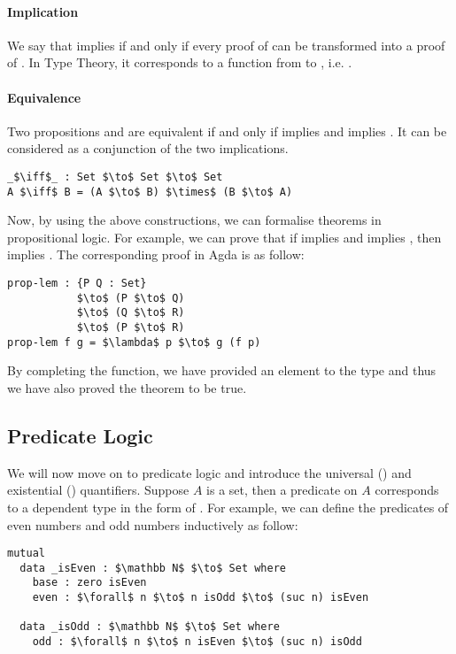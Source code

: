 \paragraph{Implication} We say that  implies  if and only
if every proof of  can be transformed into a proof of . In Type
Theory, it corresponds to a function from  to , i.e. . 

\paragraph{Equivalence} Two propositions  and
 are equivalent if and only if  implies  and  implies
. It can be considered as a conjunction of the two implications.
\begin{lstlisting}[mathescape=true,xleftmargin=.3\textwidth]
_$\iff$_ : Set $\to$ Set $\to$ Set
A $\iff$ B = (A $\to$ B) $\times$ (B $\to$ A)
\end{lstlisting} 

\par Now, by using the above constructions, we can formalise
 theorems in propositional logic. For example, we can prove that if  implies  and
 implies , then  implies . The corresponding
proof in Agda is as follow:
\begin{lstlisting}[mathescape=true,xleftmargin=.3\textwidth]
prop-lem : {P Q : Set} 
           $\to$ (P $\to$ Q) 
           $\to$ (Q $\to$ R) 
           $\to$ (P $\to$ R)
prop-lem f g = $\lambda$ p $\to$ g (f p)
\end{lstlisting} 

\par By completing the function, we have provided an element
to the type  and thus we have
also proved the theorem to be true. 


\subsection{Predicate Logic} 
\par We will now move on to predicate logic and
introduce the universal (\mb{\forall}) and existential (\mb{\exists})
quantifiers. Suppose \(A\) is a set, then a predicate on \(A\) corresponds to a dependent type in the
form of . For example, we can
define the predicates of even numbers and odd numbers inductively as follow:
\begin{lstlisting}[mathescape=true,xleftmargin=.3\textwidth]
mutual
  data _isEven : $\mathbb N$ $\to$ Set where
    base : zero isEven
    even : $\forall$ n $\to$ n isOdd $\to$ (suc n) isEven

  data _isOdd : $\mathbb N$ $\to$ Set where
    odd : $\forall$ n $\to$ n isEven $\to$ (suc n) isOdd
\end{lstlisting} 

